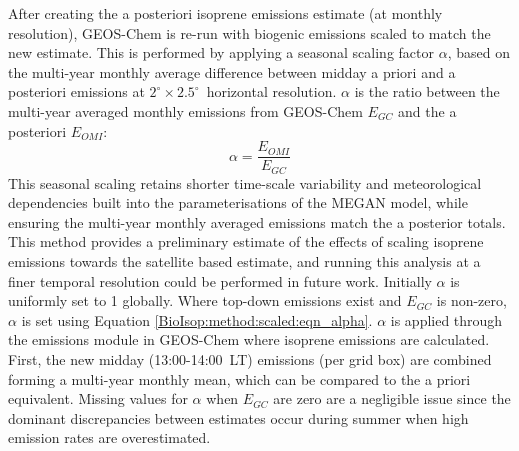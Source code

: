 \documentclass[acp, manuscript]{copernicus}
\newcommand{\apri}{E_{GC}} %
\newcommand{\apost}{E_{OMI}} %
\newcommand{\lowhr}{$2^{\circ} \times 2.5^{\circ}$}
\begin{document}
    After creating the a posteriori isoprene emissions estimate (at monthly resolution), GEOS-Chem is re-run with biogenic emissions scaled to match the new estimate. 
    This is performed by applying a seasonal scaling factor $\alpha$, based on the multi-year monthly average difference between midday a priori and a posteriori emissions at \lowhr ~horizontal resolution.
    $\alpha$ is the ratio between the multi-year averaged monthly emissions from GEOS-Chem $\apri$ and the a posteriori $\apost$: 
    \begin{equation} \label{BioIsop:method:scaled:eqn_alpha}
        \alpha = \frac{\apost}{\apri}
    \end{equation}
    This seasonal scaling retains shorter time-scale variability and meteorological dependencies built into the parameterisations of the MEGAN model, while ensuring the multi-year monthly averaged emissions match the a posterior totals.
    This method provides a preliminary estimate of the effects of scaling isoprene emissions towards the satellite based estimate, and running this analysis at a finer temporal resolution could be performed in future work.
    Initially $\alpha$ is uniformly set to 1 globally.
    Where top-down emissions exist and $\apri$ is non-zero, $\alpha$ is set using Equation \ref{BioIsop:method:scaled:eqn_alpha}.
    $\alpha$ is applied through the emissions module in GEOS-Chem where isoprene emissions are calculated.
    First, the new midday (13:00-14:00~LT) emissions (per grid box) are combined forming a multi-year monthly mean, which can be compared to the a priori equivalent.
    Missing values for $\alpha$ when $\apri$ are zero are a negligible issue since the dominant discrepancies between estimates occur during summer when high emission rates are overestimated.
    
\end{document}
